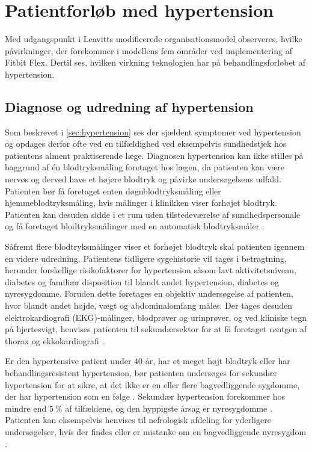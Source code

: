 \section{Patientforløb med hypertension}
Med udgangspunkt i Leavitts modificerede organisationsmodel observeres, hvilke påvirkninger, der forekommer i modellens fem områder ved implementering af Fitbit Flex. Dertil ses, hvilken virkning teknologien har på behandlingsforløbet af hypertension.

\subsection{Diagnose og udredning af hypertension} \label{sec:dia_hypertension}
Som beskrevet i \autoref{sec:hypertension} ses der sjældent symptomer ved hypertension og opdages derfor ofte ved en tilfældighed ved eksempelvis sundhedstjek hos patientens alment praktiserende læge. 
Diagnosen hypertension kan ikke stilles på baggrund af én blodtryksmåling foretaget hos lægen, da patienten kan være nervøs og derved have et højere blodtryk og påvirke undersøgelsens udfald. Patienten bør få foretaget enten døgnblodtryksmåling eller hjemmeblodtryksmåling, hvis målinger i klinikken viser forhøjet blodtryk. Patienten kan desuden sidde i et rum uden tilstedeværelse af sundhedspersonale og få foretaget blodtryksmålinger med en automatisk blodtryksmåler \citep{bech2015,lodberg2016}.

Såfremt flere blodtryksmålinger viser et forhøjet blodtryk skal patienten igennem en videre udredning. Patientens tidligere sygehistorie vil tages i betragtning, herunder forskellige risikofaktorer for hypertension såsom lavt aktivitetsniveau, diabetes og familiær disposition til blandt andet hypertension, diabetes og nyresygdomme. Foruden dette foretages en objektiv undersøgelse af patienten, hvor blandt andet højde, vægt og abdominalomfang måles. Der tages desuden elektrokardiografi (EKG)-målinger, blodprøver og urinprøver, og ved kliniske tegn på hjertesvigt, henvises patienten til sekundærsektor for at få foretaget røntgen af thorax og ekkokardiografi \citep{bech2015,lodberg2016}.

Er den hypertensive patient under $40$ år, har et meget højt blodtryk eller har behandlingsresistent hypertension, bør patienten undersøges for sekundær hypertension for at sikre, at det ikke er en eller flere bagvedliggende sygdomme, der har hypertension som en følge \citep{lodberg2016}. Sekundær hypertension forekommer hos mindre end $5~\%$ af tilfældene, og den hyppigste årsag er nyresygdomme \citep{lodberg2008}. Patienten kan eksempelvis henvises til nefrologisk afdeling for yderligere undersøgelser, hvis der findes eller er mistanke om en bagvedliggende nyresygdom \citep{lodberg2016, sundhedsstyrelsen2010}. 

